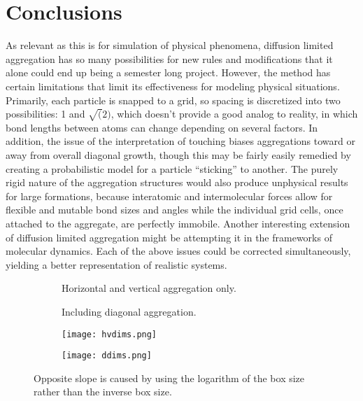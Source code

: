 \documentclass[12pt]{article}
\begin{document}
\section*{Conclusions}


As relevant as this is for simulation of physical phenomena, diffusion limited aggregation has so many possibilities for new rules and modifications that it alone could end up being a semester long project.
However, the method has certain limitations that limit its effectiveness for modeling physical situations.
Primarily, each particle is snapped to a grid, so spacing is discretized into two possibilities: 1 and $\sqrt(2)$, which doesn't provide a good analog to reality, in which bond lengths between atoms can change depending on several factors.
In addition, the issue of the interpretation of touching biases aggregations toward or away from overall diagonal growth, though this may be fairly easily remedied by creating a probabilistic model for a particle ``sticking'' to another.
The purely rigid nature of the aggregation structures would also produce unphysical results for large formations, because interatomic and intermolecular forces allow for flexible and mutable bond sizes and angles while the individual grid cells, once attached to the aggregate, are perfectly immobile.
Another interesting extension of diffusion limited aggregation might be attempting it in the frameworks of molecular dynamics.
Each of the above issues could be corrected simultaneously, yielding a better representation of realistic systems.


\begin{figure}
  \centering

  \begin{subfigure}[b]{0.85\textwidth}
    \caption{Horizontal and vertical aggregation only.}
  \end{subfigure}
  \qquad
  \begin{subfigure}[b]{0.85\textwidth}
    \caption{Including diagonal aggregation.}
  \end{subfigure}

  \caption{}
  \label{hdv}

\end{figure}

\begin{figure}
  \centering
  \vspace{-10mm}

  \begin{subfigure}[b]{0.85\textwidth}
    \texttt{[image: hvdims.png]}
  \end{subfigure}

  \begin{subfigure}[b]{0.85\textwidth}
    \texttt{[image: ddims.png]}
  \end{subfigure}

  \caption{Opposite slope is caused by using the logarithm of the box size rather than the inverse box size.}
  \label{dims}

\end{figure}
\end{document}
